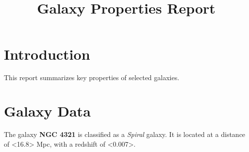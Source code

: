 \documentclass{article}
\title{Galaxy Properties Report}
\author{}
\date{}
\begin{document}
\maketitle

\section{Introduction}
This report summarizes key properties of selected galaxies.

\section{Galaxy Data}
The galaxy \textbf{NGC 4321} is classified as a \textit{Spiral} galaxy. 
It is located at a distance of <16.8> Mpc, with a redshift of <0.007>.
\end{document}
